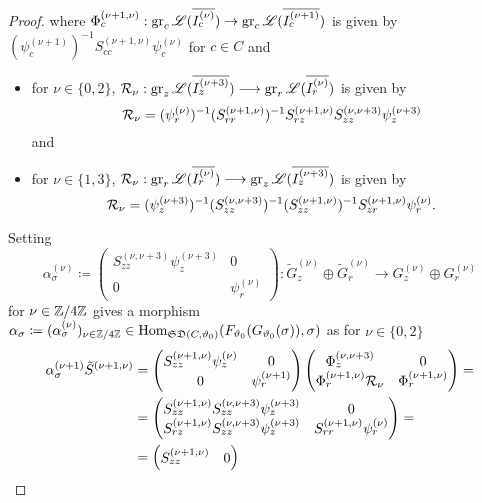 \begin{proof}
where $\Phi_c^{(\nu+1,\nu)}: \operatorname{gr}_c\mathscr{L}(\overline{I_c^{(\nu)}}) \to \operatorname{gr}_c\mathscr{L}(\overline{I_c^{(\nu+1)}})$ is given by $(\psi_c^{(\nu+1)})^{-1}S_{cc}^{(\nu+1,\nu)}\psi_c^{(\nu)}$ for $c \in C$ and 
\begin{itemize}
    \item for $\nu \in \{0,2\}$, $\mathcal{R}_\nu: \operatorname{gr}_z\mathscr{L}(\overline{I_z^{(\nu+3)}}) \longrightarrow \operatorname{gr}_r\mathscr{L}(\overline{I_r^{(\nu)}})$ is given by
        \[\mathcal{R}_\nu = (\psi_r^{(\nu)})^{-1}(S_{rr}^{(\nu+1,\nu)})^{-1} S_{rz}^{(\nu+1,\nu)} S_{zz}^{(\nu,\nu+3)}\psi_z^{(\nu+3)}\] and
    \item for $\nu \in \{1,3\}$, $\mathcal{R}_\nu: \operatorname{gr}_r\mathscr{L}(\overline{I_r^{(\nu)}}) \longrightarrow \operatorname{gr}_z\mathscr{L}(\overline{I_z^{(\nu+3)}})$ is given by
        \[\mathcal{R}_\nu = (\psi_z^{(\nu+3)})^{-1} (S_{zz}^{(\nu,\nu+3)})^{-1}(S_{zz}^{(\nu+1,\nu)})^{-1} S_{zr}^{(\nu+1,\nu)}\psi_r^{(\nu)}.\]
\end{itemize}
Setting
\[
\alpha_\sigma^{(\nu)} \coloneqq \begin{pmatrix}
    S_{zz}^{(\nu,\nu+3)}\psi_z^{(\nu+3)} & 0 \\
    0 & \psi_r^{(\nu)}
\end{pmatrix} : \tilde{G}_z^{(\nu)} \oplus \tilde{G}_r^{(\nu)} \to G_z^{(\nu)} \oplus G_r^{(\nu)}
\]
for $\nu \in \mathbb{Z}/4\mathbb{Z}$ gives a morphism $\alpha_\sigma \coloneqq (\alpha_{\sigma}^{(\nu)})_{\nu \in \mathbb{Z}/4\mathbb{Z}}\in \operatorname{Hom}_{\mathfrak{SD}(C,\vartheta_0)}(F_{\vartheta_0}(G_{\vartheta_0}(\sigma)),\sigma)$ as for $\nu \in \{0,2\}$
\begin{align*}
\alpha_\sigma^{(\nu+1)}\tilde{S}^{(\nu+1,\nu)} & = \begin{pmatrix}
    S_{zz}^{(\nu+1,\nu)}\psi_z^{(\nu)} & 0 \\
    0 & \psi_r^{(\nu+1)}
\end{pmatrix} \begin{pmatrix}
            \Phi^{(\nu,\nu+3)}_z & 0\\
            \Phi_r^{(\nu+1,\nu)} \mathcal{R}_{\nu} & \Phi_r^{(\nu+1,\nu)}
        \end{pmatrix} = \\
        & =  \begin{pmatrix}
            S_{zz}^{(\nu+1,\nu)}S_{zz}^{(\nu,\nu+3)}\psi_z^{(\nu+3)} & 0 \\
            S_{rz}^{(\nu+1,\nu)} S_{zz}^{(\nu,\nu+3)}\psi_z^{(\nu+3)} & S_{rr}^{(\nu+1,\nu)}\psi_r^{(\nu)}
        \end{pmatrix} = \\
        & = \begin{pmatrix}
            S_{zz}^{(\nu+1,\nu)} & 0 \\

\end{pmatrix}
\end{align*}
\end{proof}
